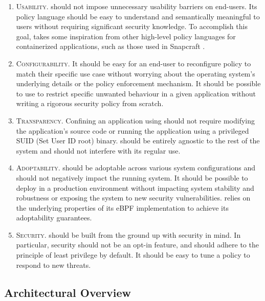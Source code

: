 \begin{enumerate}[label=\bfseries D\arabic*., ref=D\arabic*, labelindent=1em]
  \item \label{d:1} \textsc{Usability.}
    \bpfcontain{} should not impose unnecessary usability barriers on end-users.  Its policy language should be easy to understand and semantically meaningful to users without requiring significant security knowledge. To accomplish this goal, \bpfcontain{} takes some inspiration from other high-level policy languages for containerized applications, such as those used in Snapcraft \cite{snap}.

  \item \label{d:2} \textsc{Configurability.}
    It should be easy for an end-user to reconfigure policy to match their specific use case without worrying about the operating system's underlying details or the policy enforcement mechanism. It should be possible to use \bpfcontain{} to restrict specific unwanted behaviour in a given application without writing a rigorous security policy from scratch.

  \item \label{d:3} \textsc{Transparency.}
    Confining an application using \bpfcontain{} should not require modifying the application's source code or running the application using a privileged SUID (Set User ID root) binary. \bpfcontain{} should be entirely agnostic to the rest of the system and should not interfere with its regular use.

  \item \label{d:4} \textsc{Adoptability.}
    \bpfcontain{} should be adoptable across various system configurations and should not negatively impact the running system. It should be possible to deploy \bpfcontain{} in a production environment without impacting system stability and robustness or exposing the system to new security vulnerabilities. \bpfcontain{} relies on the underlying properties of its eBPF implementation to achieve its adoptability guarantees.

  \item \label{d:5} \textsc{Security.}
    \bpfcontain{} should be built from the ground up with security in mind. In particular, security should not be an opt-in feature, and \bpfcontain{} should adhere to the principle of least privilege \cite{saltzer1975_protection} by default. It should be easy to tune a \bpfcontain{} policy to respond to new threats.
\end{enumerate}

\subsection{Architectural Overview}
\label{sub:architecture}

